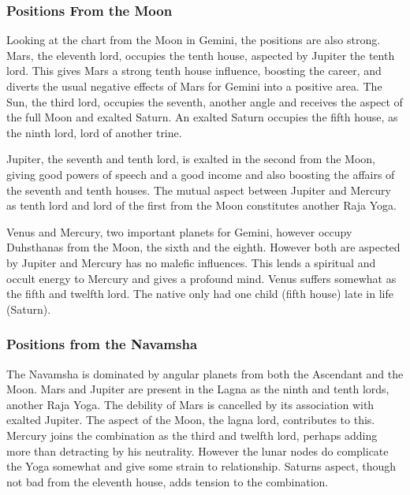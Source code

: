  

\subsubsection{Positions From the Moon}

Looking at the chart from the Moon in Gemini, the positions are also strong. Mars, the eleventh lord, occupies the tenth house, aspected by Jupiter the tenth lord. This gives Mars a strong tenth house influence, boosting the career, and diverts the usual negative effects of Mars for Gemini into a positive area. The Sun, the third lord, occupies the seventh, another angle and receives the aspect of the full Moon and exalted Saturn. An exalted Saturn occupies the fifth house, as the ninth lord, lord of another trine.

 

Jupiter, the seventh and tenth lord, is exalted in the second from the Moon, giving good powers of speech and a good income and also boosting the affairs of the seventh and tenth houses. The mutual aspect between Jupiter and Mercury as tenth lord and lord of the first from the Moon constitutes another Raja Yoga.

 

Venus and Mercury, two important planets for Gemini, however occupy Duhsthanas from the Moon, the sixth and the eighth. However both are aspected by Jupiter and Mercury has no malefic influences. This lends a spiritual and occult energy to Mercury and gives a profound mind. Venus suffers somewhat as the fifth and twelfth lord. The native only had one child (fifth house) late in life (Saturn).

 

\subsubsection{Positions from the Navamsha}

The Navamsha is dominated by angular planets from both the Ascendant and the Moon. Mars and Jupiter are present in the Lagna as the ninth and tenth lords, another Raja Yoga. The debility of Mars is cancelled by its association with exalted Jupiter. The aspect of the Moon, the lagna lord, contributes to this. Mercury joins the combination as the third and twelfth lord, perhaps adding more than detracting by his neutrality. However the lunar nodes do complicate the Yoga somewhat and give some strain to relationship. Saturns aspect, though not bad from the eleventh house, adds tension to the combination.

